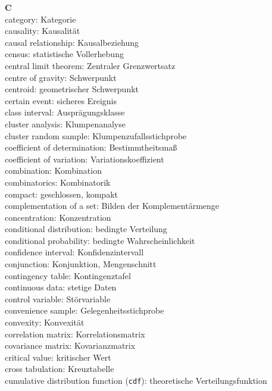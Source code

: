 \medskip
\noindent
{\bf C}\\
category: Kategorie\\
causality: Kausalit\"{a}t\\
causal relationship: Kausalbeziehung\\
census: statistische Vollerhebung\\
central limit theorem: Zentraler Grenzwertsatz\\
centre of gravity: Schwerpunkt\\
centroid: geometrischer Schwerpunkt\\
certain event: sicheres Ereignis\\
class interval: Auspr\"{a}gungsklasse\\
cluster analysis: Klumpenanalyse\\
cluster random sample: Klumpenzufallsstichprobe\\
coefficient of determination: Bestimmtheitsma\ss\\
coefficient of variation: Variationskoeffizient\\
combination: Kombination\\
combinatorics: Kombinatorik\\
compact: geschlossen, kompakt\\
complementation of a set: Bilden der Komplement\"{a}rmenge\\
concentration: Konzentration\\
conditional distribution: bedingte Verteilung\\
conditional probability: bedingte Wahrscheinlichkeit\\
confidence interval: Konfidenzintervall\\
conjunction: Konjunktion, Mengenschnitt\\
contingency table: Kontingenztafel\\
continuous data: stetige Daten\\
control variable: St\"{o}rvariable\\
convenience sample: Gelegenheitsstichprobe\\
convexity: Konvexit\"{a}t\\
correlation matrix: Korrelationsmatrix\\
covariance matrix: Kovarianzmatrix\\
critical value: kritischer Wert\\
cross tabulation: Kreuztabelle\\
cumulative distribution function ({\tt cdf}): theoretische 
Verteilungsfunktion

